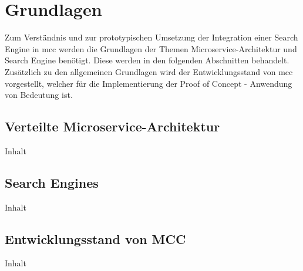 \chapter{Grundlagen\label{chap2:Zweites-Kapitel}}

Zum Verständnis und zur prototypischen Umsetzung der Integration einer Search Engine in \gls{mcc} werden die Grundlagen der Themen \glqq Microservice-Architektur\grqq{} und \glqq Search Engine\grqq{} benötigt. Diese werden in den folgenden Abschnitten behandelt. Zusätzlich zu den allgemeinen Grundlagen wird der Entwicklungsstand von \gls{mcc} vorgestellt, welcher für die Implementierung der Proof of Concept - Anwendung von Bedeutung ist.

\section{Verteilte Microservice-Architektur\label{sec2.1:Unterpunkt-1}}

Inhalt

\section{Search Engines\label{sec2.2:Unterpunkt-2}}

Inhalt

\section{Entwicklungsstand von MCC\label{sec2.3:Unterpunkt-3}}

Inhalt